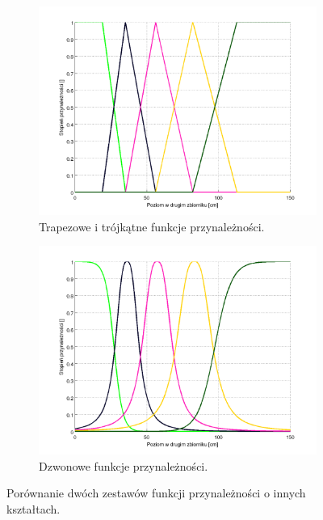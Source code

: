 \documentclass[a4paper,12pt]{article}
\begin{document}
\begin{figure}[h]
   \centering
   \begin{subfigure}[h]{0.45\textwidth}
      \includegraphics[width=\textwidth]{img/trapezoid_mfs.png}
      \caption{Trapezowe i trójkątne funkcje przynależności.}
   \end{subfigure}
   \begin{subfigure}[h]{0.45\textwidth}
      \includegraphics[width=\textwidth]{img/mfs_1b.png}
      \caption{Dzwonowe funkcje przynależności.}
   \end{subfigure}
   \caption{Porównanie dwóch zestawów funkcji przynależności o innych kształtach.}
   \label{img:mfs}
\end{figure}
\end{document}
